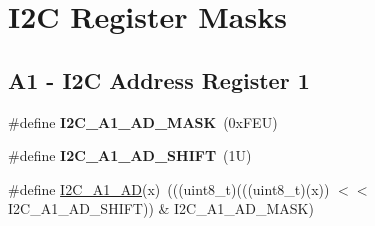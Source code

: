 \hypertarget{group___i2_c___register___masks}{}\section{I2C Register Masks}
\label{group___i2_c___register___masks}
\subsection*{A1 -\/ I2C Address Register 1}
\begin{DoxyCompactItemize}
\item 
\mbox{\label{group___i2_c___register___masks_gad90fbd42f33b89ff3296c52700771b1b}} 
\#define {\bfseries I2\+C\+\_\+\+A1\+\_\+\+A\+D\+\_\+\+M\+A\+SK}~(0x\+F\+E\+U)
\item 
\mbox{\label{group___i2_c___register___masks_gaf074658893634b95a9858ee29bbdd88a}} 
\#define {\bfseries I2\+C\+\_\+\+A1\+\_\+\+A\+D\+\_\+\+S\+H\+I\+FT}~(1\+U)
\item 
\#define \mbox{\hyperlink{group___i2_c___register___masks_ga5248771248d1964b566ca3de1cadf6a3}{I2\+C\+\_\+\+A1\+\_\+\+AD}}(x)~(((uint8\+\_\+t)(((uint8\+\_\+t)(x)) $<$$<$ I2\+C\+\_\+\+A1\+\_\+\+A\+D\+\_\+\+S\+H\+I\+FT)) \& I2\+C\+\_\+\+A1\+\_\+\+A\+D\+\_\+\+M\+A\+SK)
\end{DoxyCompactItemize}
